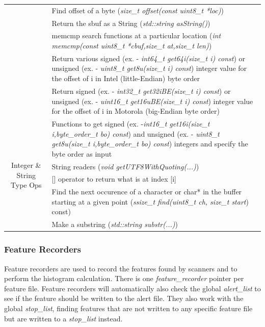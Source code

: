 \documentclass[11pt,fleqn]{article} %
\begin{document}
\begin{table}[!ht]
\begin{tabular}{|c|m{8cm}|}
& Find offset of a byte (\textit{size\_t offset(const uint8\_t *loc)}) \\\cline{2-2}
& Return the sbuf as a String (\textit{std::string asString()}) \\\cline{2-2}
\hline
\multirow{8}{4 cm}{\centering \newline \newline \newline \newline \newline \newline \newline \newline \newline Integer \& String Type Ops} & memcmp search functions at a particular location (\textit{int memcmp(const uint8\_t *cbuf,size\_t at,size\_t len)}) \\\cline{2-2} 
&  Return various signed (ex. - \textit{int64\_t get64i(size\_t i) const}) or unsigned (ex. - \textit{uint8\_t  get8u(size\_t i) const}) integer value for the offset of i in Intel (little-Endian) byte order\\\cline{2-2} 
& Return signed (ex. - \textit{int32\_t get32iBE(size\_t i) const}) or unsigned (ex. - \textit{uint16\_t get16uBE(size\_t i) const}) integer value for the offset of i in Motorola (big-Endian byte order) \\\cline{2-2} 
& Functions to get signed (ex. -\textit{int16\_t get16i(size\_t i,byte\_order\_t bo) const})  and unsigned (ex. - \textit{uint8\_t  get8u(size\_t i,byte\_order\_t bo) const}) integers and specify the byte order as input \\\cline{2-2} 
& String readers (\textit{void getUTF8WithQuoting(...)}) \\\cline{2-2}
& [] operator to return what is at index [i]\\\cline{2-2} 
& Find the next occurence of a character or char* in the buffer starting at a given point (\textit{ssize\_t find(uint8\_t ch, size\_t start}) const) \\\cline{2-2} 
& Make a substring (\textit{std::string substr(...)}) \\\cline{2-2}
\hline
\end{tabular}
\end{table}





\subsubsection{Feature Recorders}
Feature recorders are used to record the features found by \bulk scanners and to perform the histogram calculation. There is one \textit{feature\_recorder} pointer per feature file.  Feature recorders will automatically also check the global \textit{alert\_list} to see if the feature should be written to the alert file. They also work with the global \textit{stop\_list}, finding features that are not written to any specific feature file but are written to a \textit{stop\_list} instead.\\
\end{document}
